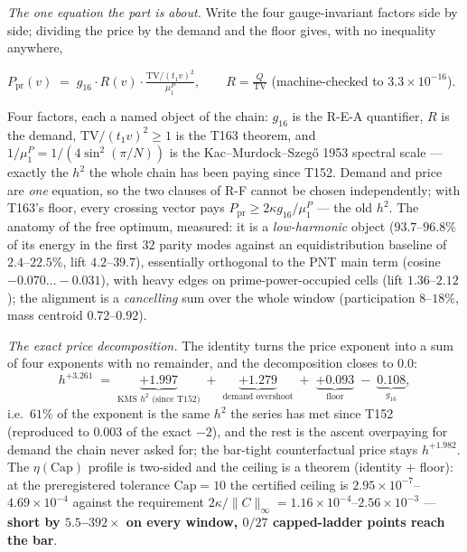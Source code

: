 \documentclass[11pt,a4paper]{article}
\begin{document}
\emph{The one equation the part is about.} Write the four gauge-invariant
factors side by side; dividing the price by the demand and the floor gives,
with no inequality anywhere,
\begin{keyeq}$\displaystyle
P_{\mathrm{pr}}(v)\;=\;g_{16}\cdot R(v)\cdot
\frac{\mathrm{TV}/(t_1v)^2}{\mu^P_1},\qquad R=\frac{Q}{\mathrm{TV}}$
\quad(machine-checked to $3.3\times10^{-16}$).
\end{keyeq}
\noindent Four factors, each a named object of the chain: $g_{16}$ is the
R-E-A quantifier, $R$ is the demand, $\mathrm{TV}/(t_1v)^2\ge1$ is the T163
theorem, and $1/\mu^P_1=1/(4\sin^2(\pi/N))$ is the Kac--Murdock--Szeg\H{o}
1953 spectral scale --- exactly the $h^2$ the whole chain has been paying
since T152. Demand and price are \emph{one} equation, so the two clauses of
R-F cannot be chosen independently; with T163's floor, every crossing vector
pays $P_{\mathrm{pr}}\ge2\kappa g_{16}/\mu^P_1$ --- the old $h^2$. The
anatomy of the free optimum, measured: it is a \emph{low-harmonic} object
($93.7$--$96.8\%$ of its energy in the first $32$ parity modes against an
equidistribution baseline of $2.4$--$22.5\%$, lift $4.2$--$39.7$), essentially
orthogonal to the PNT main term (cosine $-0.070\ldots-0.031$), with heavy
edges on prime-power-occupied cells (lift $1.36$--$2.12$); the alignment is a
\emph{cancelling} sum over the whole window (participation $8$--$18\%$, mass
centroid $0.72$--$0.92$).

\emph{The exact price decomposition.} The identity turns the price exponent
into a sum of four exponents with no remainder, and the decomposition closes
to $0.0$:
\[
h^{+3.261}\;=\;\underbrace{+1.997}_{\text{KMS }h^2\text{ (since T152)}}
\;+\;\underbrace{+1.279}_{\text{demand overshoot}}
\;+\;\underbrace{+0.093}_{\text{floor}}
\;-\;\underbrace{0.108}_{g_{16}},
\]
i.e.\ $61\%$ of the exponent is the same $h^2$ the series has met since T152
(reproduced to $0.003$ of the exact $-2$), and the rest is the ascent
overpaying for demand the chain never asked for; the bar-tight counterfactual
price stays $h^{+1.982}$. The $\eta(\mathrm{Cap})$ profile is two-sided and
the ceiling is a theorem (identity $+$ floor): at the preregistered tolerance
$\mathrm{Cap}=10$ the certified ceiling is
$2.95\times10^{-7}$--$4.69\times10^{-4}$ against the requirement
$2\kappa/\|C\|_\infty=1.16\times10^{-4}$--$2.56\times10^{-3}$ --- \textbf{short
by $5.5$--$392\times$ on every window, $0/27$ capped-ladder points reach the
bar}.
\end{document}
